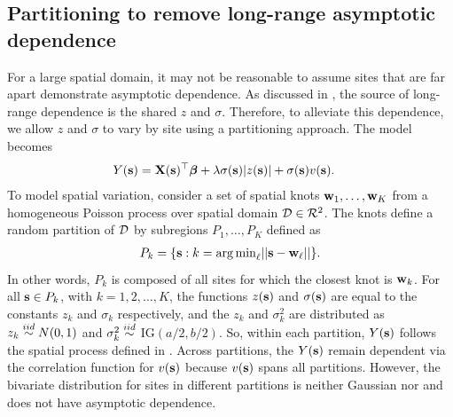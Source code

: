 \documentclass[useAMS,usenatbib,referee]{biom}
\begin{document}
\subsection{Partitioning to remove long-range asymptotic dependence}\label{sts:part}
For a large spatial domain, it may not be reasonable to assume sites that are far apart demonstrate asymptotic dependence.%
As discussed in , the source of long-range dependence is the shared $z$ and $\sigma$.
Therefore, to alleviate this dependence, we allow $z$ and $\sigma$ to vary by site using a partitioning approach.
The model becomes
\begin{align} \label{steq:partition}
  Y(\bs) &= \bX(\bs)^\top \bbeta + \lambda \sigma(\bs) |z(\bs)| + \sigma(\bs) v(\bs).
\end{align}
To model spatial variation, consider a set of spatial knots $\mbox{\bf w}_1, \ldots, \mbox{\bf w}_K$ from a homogeneous Poisson process over spatial domain $\calD \in \calR^2$.
The knots define a random partition of $\calD$ by subregions $P_{1}, \ldots, P_{K}$ defined as
\begin{align} \label{steq:subregions}
  P_{k} = \{ \bs : k = \argmin_\ell || \bs - \bw_{\ell} || \}.
\end{align}
In other words, $P_k$ is composed of all sites for which the closest knot is $\mbox{\bf w}_k$.
For all $\mbox{\bf s} \in P_k$, with $k = 1, 2, \ldots, K$, the functions $z(\mbox{\bf s})$ and $\sigma(\mbox{\bf s})$ are equal to the constants $z_k$ and $\sigma_k$ respectively, and the $z_k$ and $\sigma^2_k$ are distributed as $z_k \stackrel{iid}{\sim} N(0, 1)$ and $\sigma^2_k \stackrel{iid}{\sim}$ IG$(a / 2, b / 2)$.
So, within each partition, $Y(\mbox{\bf s})$ follows the spatial \skewt process defined in .
Across partitions, the $Y(\mbox{\bf s})$ remain dependent via the correlation function for $v(\mbox{\bf s})$ because $v(\mbox{\bf s})$ spans all partitions.
However, the bivariate distribution for sites in different partitions is neither Gaussian nor \skewt and does not have asymptotic dependence.
\end{document}
